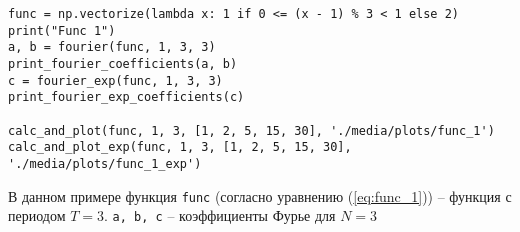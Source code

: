 \begin{lstlisting}[style=python_white, caption=Пример работы с функциями, label=lst:example1, belowskip=-0.8\baselineskip]
func = np.vectorize(lambda x: 1 if 0 <= (x - 1) % 3 < 1 else 2)
print("Func 1")
a, b = fourier(func, 1, 3, 3)
print_fourier_coefficients(a, b)
c = fourier_exp(func, 1, 3, 3)
print_fourier_exp_coefficients(c)

calc_and_plot(func, 1, 3, [1, 2, 5, 15, 30], './media/plots/func_1')
calc_and_plot_exp(func, 1, 3, [1, 2, 5, 15, 30], './media/plots/func_1_exp')
\end{lstlisting}
В данном примере функция \texttt{func} (согласно уравнению (\ref{eq:func_1})) -- функция с периодом $T = 3$. 
\texttt{a, b, c} -- коэффициенты Фурье для $N = 3$
\newline

